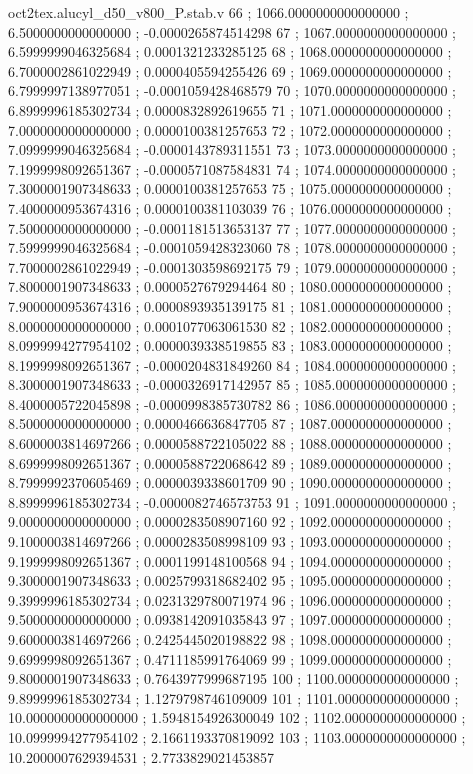 \begin{filecontents}[overwrite]{oct2tex.alucyl_d50_v800_P.stab.v}
66 ; 1066.0000000000000000 ; 6.5000000000000000 ; -0.0000265874514298
67 ; 1067.0000000000000000 ; 6.5999999046325684 ; 0.0001321233285125
68 ; 1068.0000000000000000 ; 6.7000002861022949 ; 0.0000405594255426
69 ; 1069.0000000000000000 ; 6.7999997138977051 ; -0.0001059428468579
70 ; 1070.0000000000000000 ; 6.8999996185302734 ; 0.0000832892619655
71 ; 1071.0000000000000000 ; 7.0000000000000000 ; 0.0000100381257653
72 ; 1072.0000000000000000 ; 7.0999999046325684 ; -0.0000143789311551
73 ; 1073.0000000000000000 ; 7.1999998092651367 ; -0.0000571087584831
74 ; 1074.0000000000000000 ; 7.3000001907348633 ; 0.0000100381257653
75 ; 1075.0000000000000000 ; 7.4000000953674316 ; 0.0000100381103039
76 ; 1076.0000000000000000 ; 7.5000000000000000 ; -0.0001181513653137
77 ; 1077.0000000000000000 ; 7.5999999046325684 ; -0.0001059428323060
78 ; 1078.0000000000000000 ; 7.7000002861022949 ; -0.0001303598692175
79 ; 1079.0000000000000000 ; 7.8000001907348633 ; 0.0000527679294464
80 ; 1080.0000000000000000 ; 7.9000000953674316 ; 0.0000893935139175
81 ; 1081.0000000000000000 ; 8.0000000000000000 ; 0.0001077063061530
82 ; 1082.0000000000000000 ; 8.0999994277954102 ; 0.0000039338519855
83 ; 1083.0000000000000000 ; 8.1999998092651367 ; -0.0000204831849260
84 ; 1084.0000000000000000 ; 8.3000001907348633 ; -0.0000326917142957
85 ; 1085.0000000000000000 ; 8.4000005722045898 ; -0.0000998385730782
86 ; 1086.0000000000000000 ; 8.5000000000000000 ; 0.0000466636847705
87 ; 1087.0000000000000000 ; 8.6000003814697266 ; 0.0000588722105022
88 ; 1088.0000000000000000 ; 8.6999998092651367 ; 0.0000588722068642
89 ; 1089.0000000000000000 ; 8.7999992370605469 ; 0.0000039338601709
90 ; 1090.0000000000000000 ; 8.8999996185302734 ; -0.0000082746573753
91 ; 1091.0000000000000000 ; 9.0000000000000000 ; 0.0000283508907160
92 ; 1092.0000000000000000 ; 9.1000003814697266 ; 0.0000283508998109
93 ; 1093.0000000000000000 ; 9.1999998092651367 ; 0.0001199148100568
94 ; 1094.0000000000000000 ; 9.3000001907348633 ; 0.0025799318682402
95 ; 1095.0000000000000000 ; 9.3999996185302734 ; 0.0231329780071974
96 ; 1096.0000000000000000 ; 9.5000000000000000 ; 0.0938142091035843
97 ; 1097.0000000000000000 ; 9.6000003814697266 ; 0.2425445020198822
98 ; 1098.0000000000000000 ; 9.6999998092651367 ; 0.4711185991764069
99 ; 1099.0000000000000000 ; 9.8000001907348633 ; 0.7643977999687195
100 ; 1100.0000000000000000 ; 9.8999996185302734 ; 1.1279798746109009
101 ; 1101.0000000000000000 ; 10.0000000000000000 ; 1.5948154926300049
102 ; 1102.0000000000000000 ; 10.0999994277954102 ; 2.1661193370819092
103 ; 1103.0000000000000000 ; 10.2000007629394531 ; 2.7733829021453857

\end{filecontents}
